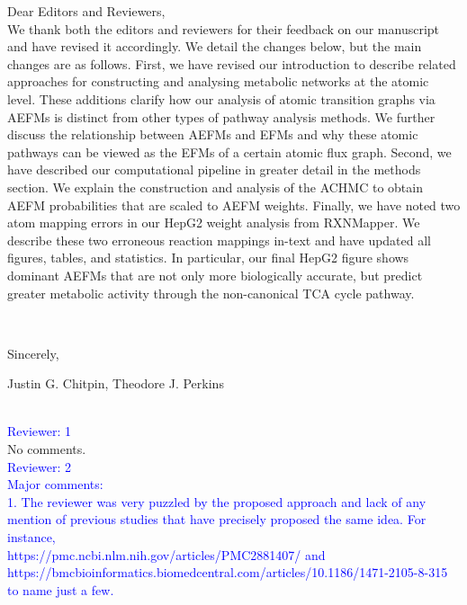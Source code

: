 \documentclass[11pt]{article}
\begin{document}
\noindent Dear Editors and Reviewers,\\

We thank both the editors and reviewers for their feedback on our
manuscript and have revised it accordingly. We detail the changes below,
but the main changes are as follows. First, we have revised our
introduction to describe related approaches for constructing and analysing
metabolic networks at the atomic level. These additions clarify how our
analysis of atomic transition graphs via AEFMs is distinct from other types of
pathway analysis methods. We further discuss the relationship between AEFMs and
EFMs and why these atomic pathways can be viewed as the EFMs of a certain
atomic flux graph. Second, we have described our computational pipeline in
greater detail in the methods section. We explain the construction and analysis
of the ACHMC to obtain AEFM probabilities that are scaled to AEFM weights.
Finally, we have noted two atom mapping errors in our HepG2 weight
analysis from RXNMapper. We describe these two erroneous reaction mappings
in-text and have updated all figures, tables, and statistics. In
particular, our final HepG2 figure shows dominant AEFMs that are not only
more biologically accurate, but predict greater metabolic activity through
the non-canonical TCA cycle pathway.

~

\noindent Sincerely,

\noindent Justin G. Chitpin, Theodore J. Perkins



~\\

\noindent\textcolor{blue}{Reviewer: 1}\\

No comments.\\

\noindent\textcolor{blue}{Reviewer: 2}\\

\noindent\textcolor{blue}{Major comments:}\\

\noindent\textcolor{blue}{1. The reviewer was very puzzled by the proposed
approach and lack of any mention of previous studies that have precisely
proposed the same idea. For instance,\\
https://pmc.ncbi.nlm.nih.gov/articles/PMC2881407/ and\\
https://bmcbioinformatics.biomedcentral.com/articles/10.1186/1471-2105-8-315
to name just a few.}\\
\end{document}
